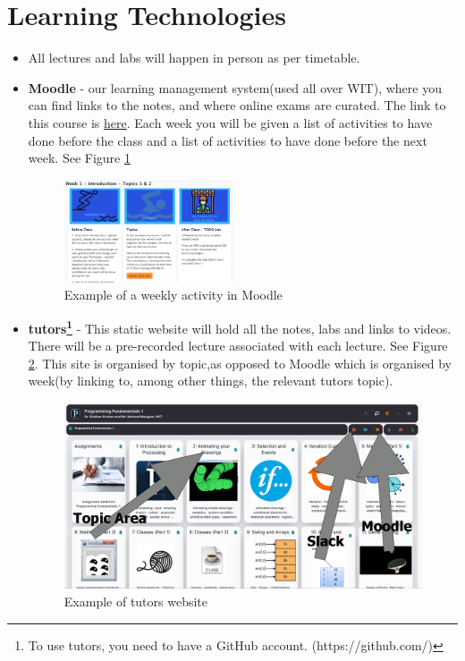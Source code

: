 \documentclass{article}
\begin{document}
\section{Learning Technologies}
\begin{itemize}
\item All lectures and labs  will happen in person as per timetable.

\item \textbf{Moodle} - our learning management system(used all over WIT), where you can find links to the notes, and where online exams are curated. The link to this course is \href{https://moodle.wit.ie/course/view.php?id=184953}{here}.  
Each week you will be given a list of activities to have done before the class and 
a list of activities to have done before the next week. See Figure \ref{fig:todo}
\begin{figure}[h]
    \centering
    \includegraphics[width=2in]{img/week-todo.png}
    \caption{Example of a weekly activity in Moodle}
    \label{fig:todo}
\end{figure}
\item \textbf{tutors\footnote{To use tutors, you need to have a GitHub account. (https://github.com/)}} 
 - This static website will hold all the notes, labs and links to videos. There will be a pre-recorded lecture associated with each lecture. See Figure \ref{tutors}.
This site is organised by topic,as opposed to Moodle which is organised by week(by linking to, among other things,  the relevant tutors topic).
\begin{figure}[h]
\centering
\includegraphics[width=.6\textwidth]{img/proc-tutors.png}
\caption{Example of tutors website}
\label{tutors}
\end{figure}


\end{itemize}
\end{document}
